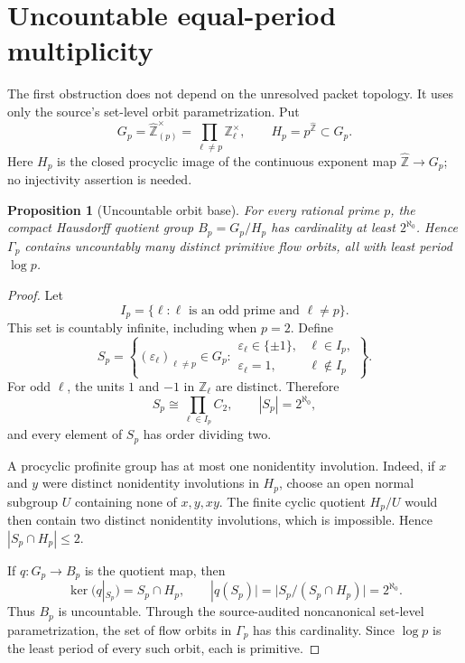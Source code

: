 \documentclass[11pt]{article}
\newtheorem{proposition}[theorem]{Proposition}
\theoremstyle{definition}
\theoremstyle{remark}
\newcommand{\Z}{\mathbb{Z}}
\begin{document}
\section{Uncountable equal-period multiplicity}
\label{sec:uncountable}

The first obstruction does not depend on the unresolved packet topology.  It
uses only the source's set-level orbit parametrization.  Put
\[
 G_p=\widehat{\Z}_{(p)}^\times
     =\prod_{\ell\ne p}\Z_\ell^\times,
 \qquad
 H_p=p^{\widehat{\Z}}\subset G_p.
\]
Here \(H_p\) is the closed procyclic image of the continuous exponent map
\(\widehat{\Z}\to G_p\); no injectivity assertion is needed.

\begin{proposition}[Uncountable orbit base]
\label{prop:uncountable}
For every rational prime \(p\), the compact Hausdorff quotient group
\(B_p=G_p/H_p\) has cardinality at least \(2^{\aleph_0}\).  Hence
\(\Gamma_p\) contains uncountably many distinct primitive flow orbits, all
with least period \(\log p\).
\end{proposition}

\begin{proof}
Let
\[
 I_p=\{\ell:\ell\text{ is an odd prime and }\ell\ne p\}.
\]
This set is countably infinite, including when \(p=2\).  Define
\[
 S_p=\left\{(\varepsilon_\ell)_{\ell\ne p}\in G_p:
 \begin{array}{ll}
 \varepsilon_\ell\in\{\pm1\},&\ell\in I_p,\\
 \varepsilon_\ell=1,&\ell\notin I_p
 \end{array}\right\}.
\]
For odd \(\ell\), the units \(1\) and \(-1\) in \(\Z_\ell\) are distinct.
Therefore
\[
 S_p\cong\prod_{\ell\in I_p}C_2,
 \qquad |S_p|=2^{\aleph_0},
\]
and every element of \(S_p\) has order dividing two.

A procyclic profinite group has at most one nonidentity involution.  Indeed,
if \(x\) and \(y\) were distinct nonidentity involutions in \(H_p\), choose an
open normal subgroup \(U\) containing none of \(x,y,xy\).  The finite cyclic
quotient \(H_p/U\) would then contain two distinct nonidentity involutions,
which is impossible.  Hence \(|S_p\cap H_p|\le2\).

If \(q:G_p\to B_p\) is the quotient map, then
\[
 \ker(q|_{S_p})=S_p\cap H_p,
 \qquad
 |q(S_p)|=|S_p/(S_p\cap H_p)|=2^{\aleph_0}.
\]
Thus \(B_p\) is uncountable.  Through the source-audited noncanonical
set-level parametrization, the set of flow orbits in \(\Gamma_p\) has this
cardinality.  Since \(\log p\) is the least period of every such orbit, each
is primitive.
\end{proof}
\end{document}
